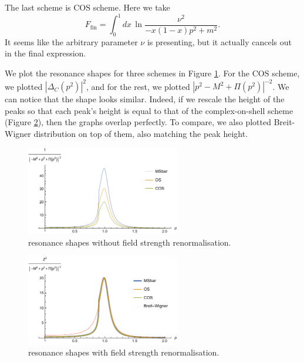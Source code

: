 \documentclass[11pt]{article}
\theoremstyle{definition}
\theoremstyle{remark}
\begin{document}
	The last scheme is $\mathrm{COS}$ scheme.
	Here we take
	\[F_{\mathrm{fin}}=\int_{0}^{1}dx\,\ln\frac{\nu^{2}}{-x(1-x)p^{2}+m^{2}}.\]
	It seems like the arbitrary parameter $\nu$ is presenting, but it actually cancels out in the final expression.
	
	We plot the resonance shapes for three schemes in Figure \ref{fig:3scheme}.
	For the $\mathrm{COS}$ scheme, we plotted $|\Delta_{C}(p^{2})|^{2}$, and for the rest, we plotted $|p^{2}-M^{2}+\Pi(p^{2})|^{-2}$.
	We can notice that the shape looks similar.
	Indeed, if we rescale the height of the peaks so that each peak's height is equal to that of the complex-on-shell scheme (Figure \ref{fig:3scheme2}), then the graphs overlap perfectly.
	To compare, we also plotted Breit-Wigner distribution on top of them, also matching the peak height.
	
	\begin{figure}[h]
		\centering
		\includegraphics[width=0.6\textwidth]{olsi1.pdf}
		\caption{resonance shapes without field strength renormalisation.}
		\label{fig:3scheme}
	\end{figure}
	\begin{figure}[h]
		\centering
		\includegraphics[width=0.6\textwidth]{olsi2.pdf}
		\caption{resonance shapes with field strength renormalisation.}
		\label{fig:3scheme2}
	\end{figure}
	
\end{document}
